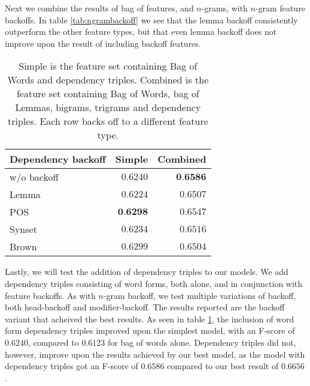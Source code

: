 \documentclass[11pt,letterpaper]{article}
\begin{document}
Next we combine the results of bag of features, and $n$-grams, with $n$-gram feature backoffs. In table \ref{tab:ngrambackoff} we see that the lemma backoff consistently outperform the other feature types, but that even lemma backoff does not improve upon the result of including backoff features.

\begin{table}
  \begin{center}
    \begin{tabular}{lrr}
      \toprule
      
      
      Dependency backoff & Simple & Combined\\
      \midrule
      w/o backoff & $0.6240$ & $\textbf{0.6586}$ \\
      Lemma & $0.6224$ & $0.6507$ \\
      POS & $\textbf{0.6298}$ & $0.6547$ \\ %
      Synset & $0.6234$ & $0.6516$  \\ %
      Brown & $0.6299$ & $0.6504$ \\ %
      
      
      
      \bottomrule

    \end{tabular}
  \end{center}
  \caption{Simple is the feature set containing Bag of Words and dependency triples. Combined is the feature set containing Bag of Words, bag of Lemmas, bigrams, trigrams and dependency triples. Each row backs off to a different feature type.}
  \label{tab:depbackoff}
\end{table}

Lastly, we will test the addition of dependency triples to our models. We add dependency triples consisting of word forms, both alone, and in conjunction with feature backoffs. As with $n$-gram backoff, we test multiple variations of backoff, both head-backoff and modifier-backoff. The results reported are the backoff variant that acheived the best results. As seen in  table \ref{tab:depbackoff}, the inclusion of word form dependency triples improved upon the simplest model, with an F-score of $0.6240$, compared to $0.6123$ for bag of words alone. Dependency triples did not, however, improve upon the results achieved by our best model, as the model with dependency triples got an F-score of $0.6586$ compared to our best result of $0.6656$.
\end{document}
